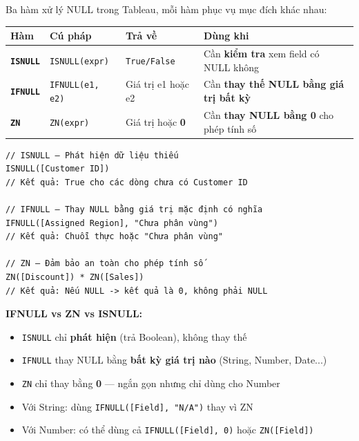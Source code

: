 \documentclass[12pt]{article}
\begin{document}
\noindent Ba hàm xử lý NULL trong Tableau, mỗi hàm phục vụ mục đích khác nhau:

\begin{center}
\renewcommand{\arraystretch}{1.4}
\begin{tabularx}{\linewidth}{l l l X}
\toprule
\textbf{Hàm} & \textbf{Cú pháp} & \textbf{Trả về} & \textbf{Dùng khi} \\
\midrule
\textbf{\texttt{ISNULL}} & \texttt{ISNULL(expr)} & \texttt{True/False} & Cần \textbf{kiểm tra} xem field có NULL không \\
\textbf{\texttt{IFNULL}} & \texttt{IFNULL(e1, e2)} & Giá trị e1 hoặc e2 & Cần \textbf{thay thế NULL bằng giá trị bất kỳ} \\
\textbf{\texttt{ZN}} & \texttt{ZN(expr)} & Giá trị hoặc \textbf{0} & Cần \textbf{thay NULL bằng 0} cho phép tính số \\
\bottomrule
\end{tabularx}
\end{center}

\begin{aivncodebox}[]
\begin{lstlisting}
// ISNULL — Phát hiện dữ liệu thiếu
ISNULL([Customer ID])
// Kết quả: True cho các dòng chưa có Customer ID

// IFNULL — Thay NULL bằng giá trị mặc định có nghĩa
IFNULL([Assigned Region], "Chưa phân vùng")
// Kết quả: Chuỗi thực hoặc "Chưa phân vùng"

// ZN — Đảm bảo an toàn cho phép tính số
ZN([Discount]) * ZN([Sales])
// Kết quả: Nếu NULL -> kết quả là 0, không phải NULL
\end{lstlisting}
\end{aivncodebox}

\begin{notebox}
\textbf{IFNULL vs ZN vs ISNULL:}
\begin{itemize}[nosep]
    \item \texttt{ISNULL} chỉ \textbf{phát hiện} (trả Boolean), không thay thế
    \item \texttt{IFNULL} thay NULL bằng \textbf{bất kỳ giá trị nào} (String, Number, Date...)
    \item \texttt{ZN} chỉ thay bằng \textbf{0} --- ngắn gọn nhưng chỉ dùng cho Number
    \item Với String: dùng \texttt{IFNULL([Field], "N/A")} thay vì ZN
    \item Với Number: có thể dùng cả \texttt{IFNULL([Field], 0)} hoặc \texttt{ZN([Field])}
\end{itemize}
\end{notebox}
\end{document}
